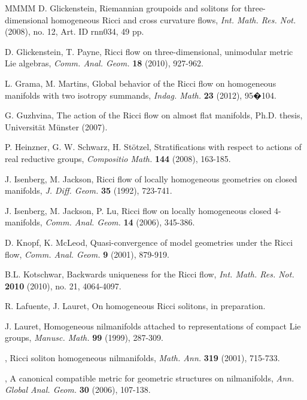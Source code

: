 \documentclass[11pt]{amsart}
\theoremstyle{plain}
\theoremstyle{definition}
\theoremstyle{remark}
\begin{document}
\begin{thebibliography}{MMMM}
 {\sc D. Glickenstein}, Riemannian groupoids and solitons for three-dimensional homogeneous Ricci and cross
curvature flows, {\it Int. Math. Res. Not.} (2008), no. 12, Art. ID rnn034, 49 pp.

 {\sc D. Glickenstein, T. Payne}, Ricci flow on three-dimensional, unimodular metric Lie algebras,
{\it Comm. Anal. Geom.} {\bf 18} (2010), 927-962.

 {\sc L. Grama, M. Martins}, Global behavior of the Ricci flow on homogeneous manifolds with two isotropy summands,
{\it Indag. Math.} {\bf 23} (2012), 95�104.

 {\sc G. Guzhvina}, The action of the Ricci flow on almost flat manifolds, Ph.D. thesis, Universit\"at M\"unster (2007).

 {\sc P. Heinzner, G. W. Schwarz, H. St\"otzel}, Stratifications with respect to actions of real reductive groups, {\it Compositio Math.} \textbf{144} (2008), 163-185.

 {\sc J. Isenberg, M. Jackson}, Ricci flow of locally homogeneous geometries on closed manifolds, {\it J. Diff. Geom.} {\bf 35} (1992), 723-741.

 {\sc J. Isenberg, M. Jackson, P. Lu}, Ricci flow on locally homogeneous closed $4$-manifolds, {\it Comm. Anal. Geom.} {\bf 14} (2006), 345-386.

 {\sc D. Knopf, K. McLeod}, Quasi-convergence of model geometries under the Ricci flow,
{\it Comm. Anal. Geom.} {\bf 9} (2001), 879-919.

 {\sc B.L. Kotschwar}, Backwards uniqueness for the Ricci flow, {\it Int. Math. Res. Not.} {\bf 2010} (2010), no. 21, 4064-4097.

 {\sc R. Lafuente, J. Lauret}, On homogeneous Ricci solitons, in preparation.

 {\sc J. Lauret}, Homogeneous nilmanifolds attached to
representations of compact Lie groups,
{\it Manusc. Math.} {\bf 99} (1999), 287-309.

  \bysame, Ricci soliton homogeneous nilmanifolds,
{\it Math. Ann.} \textbf{319} (2001), 715-733.

 \bysame, A canonical compatible metric for geometric structures on
nilmanifolds, {\it Ann. Global Anal. Geom.} {\bf 30} (2006), 107-138.


\end{thebibliography}
\end{document}
